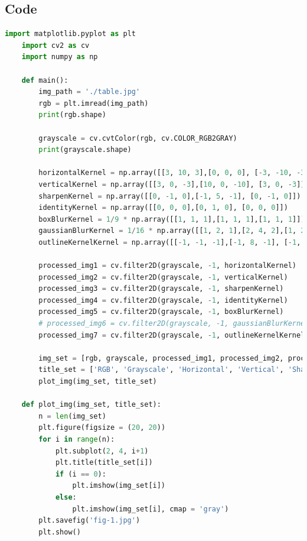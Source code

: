 \documentclass{article}
\begin{document}
{    \subsection{Code}
    \lstset{style=mystyle}
    \begin{lstlisting}[language=Python, caption=Code for image filtering based on different filters]
    import matplotlib.pyplot as plt
    import cv2 as cv
    import numpy as np
    
    def main():
        img_path = './table.jpg'
        rgb = plt.imread(img_path)
        print(rgb.shape)
    
        grayscale = cv.cvtColor(rgb, cv.COLOR_RGB2GRAY)
        print(grayscale.shape)
    
        horizontalKernel = np.array([[3, 10, 3],[0, 0, 0], [-3, -10, -3]])
        verticalKernel = np.array([[3, 0, -3],[10, 0, -10], [3, 0, -3]])
        sharpenKernel = np.array([[0, -1, 0],[-1, 5, -1], [0, -1, 0]])
        identityKernel = np.array([[0, 0, 0],[0, 1, 0], [0, 0, 0]])
        boxBlurKernel = 1/9 * np.array([[1, 1, 1],[1, 1, 1],[1, 1, 1]])
        gaussianBlurKernel = 1/16 * np.array([[1, 2, 1],[2, 4, 2],[1, 2, 1]])
        outlineKernelKernel = np.array([[-1, -1, -1],[-1, 8, -1], [-1, -1, -1]])
    
        processed_img1 = cv.filter2D(grayscale, -1, horizontalKernel)
        processed_img2 = cv.filter2D(grayscale, -1, verticalKernel)
        processed_img3 = cv.filter2D(grayscale, -1, sharpenKernel)
        processed_img4 = cv.filter2D(grayscale, -1, identityKernel)
        processed_img5 = cv.filter2D(grayscale, -1, boxBlurKernel)
        # processed_img6 = cv.filter2D(grayscale, -1, gaussianBlurKernel)
        processed_img7 = cv.filter2D(grayscale, -1, outlineKernelKernel)
    
        img_set = [rgb, grayscale, processed_img1, processed_img2, processed_img3, processed_img4, processed_img5, processed_img7]#, processed_img6]
        title_set = ['RGB', 'Grayscale', 'Horizontal', 'Vertical', 'Sharpen', 'Identity', 'Box Blur', 'Outline']#, 'Gaussian Blur']
        plot_img(img_set, title_set)
    
    def plot_img(img_set, title_set):
        n = len(img_set)
        plt.figure(figsize = (20, 20))
        for i in range(n):
            plt.subplot(2, 4, i+1)
            plt.title(title_set[i])
            if (i == 0):
                plt.imshow(img_set[i])
            else:
                plt.imshow(img_set[i], cmap = 'gray')
        plt.savefig('fig-1.jpg')
        plt.show()
    

\end{lstlisting}}
\end{document}
